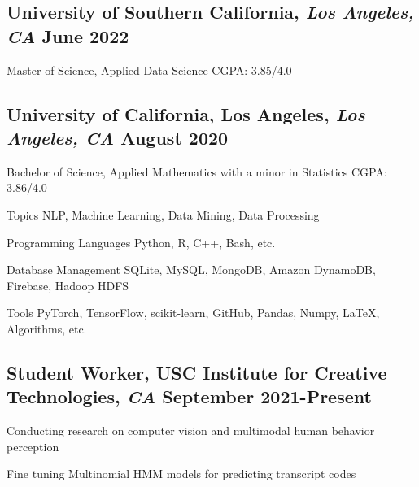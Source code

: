 \documentclass[11pt]{article}
\begin{document}
\subsection*{University of Southern California{\normalfont, \textit{Los Angeles, CA} \hfill June 2022}}
\noindent
Master of Science, Applied Data Science
\hfill
CGPA: 3.85/4.0

\vspace{0.1in}

\subsection*{University of California, Los Angeles{\normalfont, \textit{Los Angeles, CA} \hfill August 2020}}
\noindent
Bachelor of Science, Applied Mathematics with a minor in Statistics
\hfill
CGPA: 3.86/4.0

\vspace{0.1in}

\begin{compactdesc}
	\item[Topics] NLP, Machine Learning, Data Mining, Data Processing
    \item[Programming Languages] Python, R, C++, Bash, etc.
    \item[Database Management] SQLite, MySQL, MongoDB, Amazon DynamoDB, Firebase, Hadoop HDFS
    \item[Tools] PyTorch, TensorFlow, scikit-learn, GitHub, Pandas, Numpy, \LaTeX,
    Algorithms, etc.
\end{compactdesc}
\vspace{0.1in}

\subsection*{Student Worker{\normalfont, USC Institute for Creative
            Technologies,
            \textit{CA} \hfill
            September 2021-Present}}
\begin{compactitem}
    \item Conducting research on computer vision and multimodal
    human behavior perception
    \item Fine tuning Multinomial HMM models for predicting transcript codes
\end{compactitem}
\vspace{0.1in}
\end{document}

